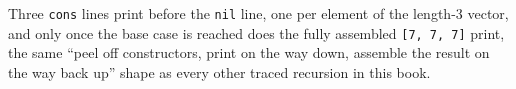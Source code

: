Three \texttt{cons} lines print before the \texttt{nil} line, one per element of the length-3 vector, and only once the base case is reached does the fully assembled \texttt{[7, 7, 7]} print, the same ``peel off constructors, print on the way down, assemble the result on the way back up'' shape as every other traced recursion in this book.
